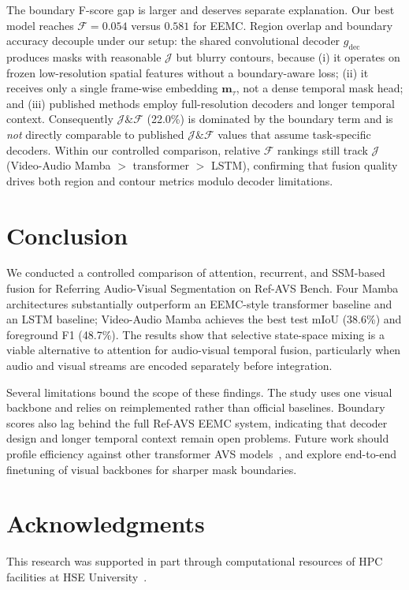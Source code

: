 \documentclass[a4paper,12pt]{extarticle}
\begin{document}
The boundary F-score gap is larger and deserves separate explanation. Our best model reaches $\mathcal{F}{=}0.054$ versus $0.581$ for EEMC. Region overlap and boundary accuracy decouple under our setup: the shared convolutional decoder $g_{\mathrm{dec}}$ produces masks with reasonable $\mathcal{J}$ but blurry contours, because (i) it operates on frozen low-resolution spatial features without a boundary-aware loss; (ii) it receives only a single frame-wise embedding $\mathbf{m}_\tau$, not a dense temporal mask head; and (iii) published methods employ full-resolution decoders and longer temporal context. Consequently $\mathcal{J}\&\mathcal{F}$ (22.0\%) is dominated by the boundary term and is \emph{not} directly comparable to published $\mathcal{J}\&\mathcal{F}$ values that assume task-specific decoders. Within our controlled comparison, relative $\mathcal{F}$ rankings still track $\mathcal{J}$ (Video-Audio Mamba $>$ transformer $>$ LSTM), confirming that fusion quality drives both region and contour metrics modulo decoder limitations.

\section{Conclusion}

We conducted a controlled comparison of attention, recurrent, and SSM-based fusion for Referring Audio-Visual Segmentation on Ref-AVS Bench. Four Mamba architectures substantially outperform an EEMC-style transformer baseline and an LSTM baseline; Video-Audio Mamba achieves the best test mIoU (38.6\%) and foreground F1 (48.7\%). The results show that selective state-space mixing is a viable alternative to attention for audio-visual temporal fusion, particularly when audio and visual streams are encoded separately before integration.

Several limitations bound the scope of these findings. The study uses one visual backbone and relies on reimplemented rather than official baselines. Boundary scores also lag behind the full Ref-AVS EEMC system, indicating that decoder design and longer temporal context remain open problems. Future work should profile efficiency against other transformer AVS models~\cite{avsegformer2023, revisitingAVSeg2025, tsam2025}, and explore end-to-end finetuning of visual backbones for sharper mask boundaries.



\section*{Acknowledgments}
This research was supported in part through computational resources of HPC facilities at HSE University~\cite{kostenetskiy2021hpc}.

\newpage 
\printbibliography[heading=bibintoc]
\newpage
\appendix
\end{document}
